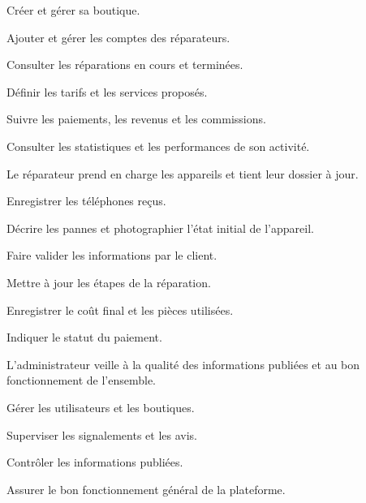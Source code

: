 \begin{cdcitems}
  \item Créer et gérer sa boutique.
  \item Ajouter et gérer les comptes des réparateurs.
  \item Consulter les réparations en cours et terminées.
  \item Définir les tarifs et les services proposés.
  \item Suivre les paiements, les revenus et les commissions.
  \item Consulter les statistiques et les performances de son activité.
\end{cdcitems}


Le réparateur prend en charge les appareils et tient leur dossier à jour.

\begin{cdcitems}
  \item Enregistrer les téléphones reçus.
  \item Décrire les pannes et photographier l’état initial de l’appareil.
  \item Faire valider les informations par le client.
  \item Mettre à jour les étapes de la réparation.
  \item Enregistrer le coût final et les pièces utilisées.
  \item Indiquer le statut du paiement.
\end{cdcitems}


L’administrateur veille à la qualité des informations publiées et au bon fonctionnement de l’ensemble.

\begin{cdcitems}
  \item Gérer les utilisateurs et les boutiques.
  \item Superviser les signalements et les avis.
  \item Contrôler les informations publiées.
  \item Assurer le bon fonctionnement général de la plateforme.
\end{cdcitems}
